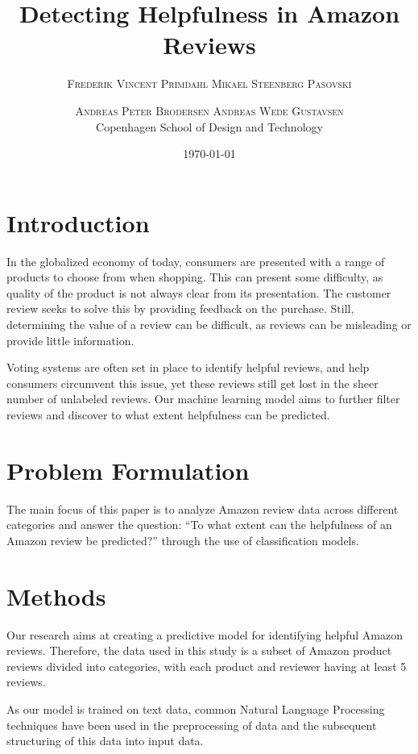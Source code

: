 \documentclass[twoside,twocolumn]{article}
\title{Detecting Helpfulness in Amazon Reviews} %
\author{%
\textsc{Frederik Vincent Primdahl} \textsc{Mikael Steenberg Pasovski} \and \textsc{Andreas Peter Brodersen} \textsc{Andreas Wede Gustavsen} \\[1ex] %
\normalsize Copenhagen School of Design and Technology \\ %
}
\date{\today} %
\begin{document}
\maketitle


\section{Introduction}
In the globalized economy of today, consumers are presented with a range of products to choose from when shopping. This can present some difficulty, as quality of the product is not always clear from its presentation. The customer review seeks to solve this by providing feedback on the purchase. Still, determining the value of a review can be difficult, as reviews can be misleading or provide little information.

Voting systems are often set in place to identify helpful reviews, and help consumers circumvent this issue, yet these reviews still get lost in the sheer number of unlabeled reviews. Our machine learning model aims to further filter reviews and discover to what extent helpfulness can be predicted.

\section{Problem Formulation}

The main focus of this paper is to analyze Amazon review data across different categories and answer the question: “To what extent can the helpfulness of an Amazon review be predicted?” through the use of classification models.

\section{Methods}
Our research aims at creating a predictive model for identifying helpful Amazon reviews. Therefore, the data used in this study is a subset of Amazon product reviews divided into categories, with each product and reviewer having at least 5 reviews.

As our model is trained on text data, common Natural Language Processing techniques have been used in the preprocessing of data and the subsequent structuring of this data into input data.
\end{document}
